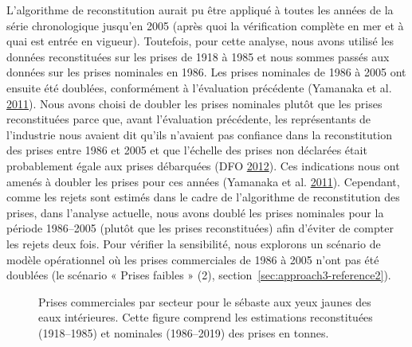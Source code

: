 \documentclass[11pt]{book}
\begin{document}
L'algorithme de reconstitution aurait pu être appliqué à toutes les années de la série chronologique jusqu'en 2005 (après quoi la vérification complète en mer et à quai est entrée en vigueur). Toutefois, pour cette analyse, nous avons utilisé les données reconstituées sur les prises de 1918 à 1985 et nous sommes passés aux données sur les prises nominales en 1986. Les prises nominales de 1986 à 2005 ont ensuite été doublées, conformément à l'évaluation précédente (Yamanaka et al. \protect\hyperlink{ref-yamanaka2011}{2011}). Nous avons choisi de doubler les prises nominales plutôt que les prises reconstituées parce que, avant l'évaluation précédente, les représentants de l'industrie nous avaient dit qu'ils n'avaient pas confiance dans la reconstitution des prises entre 1986 et 2005 et que l'échelle des prises non déclarées était probablement égale aux prises débarquées (DFO \protect\hyperlink{ref-dfo2012b}{2012}). Ces indications nous ont amenés à doubler les prises pour ces années (Yamanaka et al. \protect\hyperlink{ref-yamanaka2011}{2011}). Cependant, comme les rejets sont estimés dans le cadre de l'algorithme de reconstitution des prises, dans l'analyse actuelle, nous avons doublé les prises nominales pour la période 1986--2005 (plutôt que les prises reconstituées) afin d'éviter de compter les rejets deux fois. Pour vérifier la sensibilité, nous explorons un scénario de modèle opérationnel où les prises commerciales de 1986 à 2005 n'ont pas été doublées (le scénario « Prises faibles » (2), section~\ref{sec:approach3-reference2}).
\begin{figure}[htb]

{\centering {} 

}

\caption{Prises commerciales par secteur pour le sébaste aux yeux jaunes des eaux intérieures. Cette figure comprend les estimations reconstituées (1918--1985) et nominales (1986--2019) des prises en tonnes.}\label{fig:commcatch2}
\end{figure}
\clearpage
\end{document}
